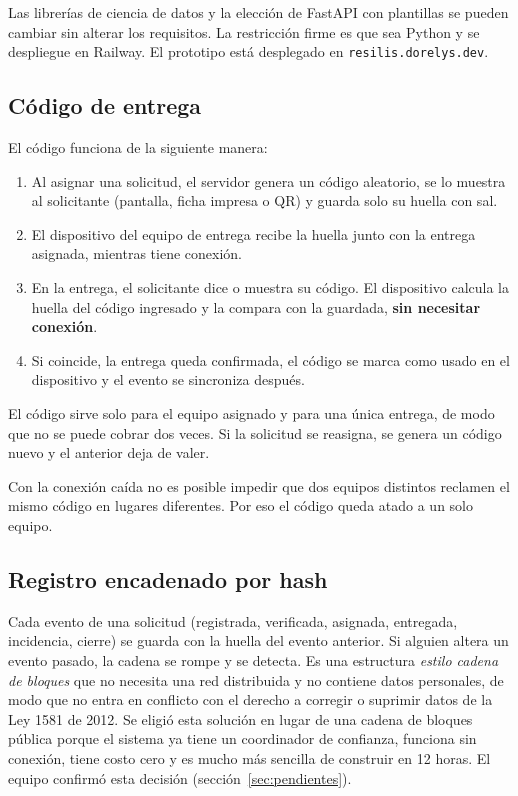 Las librerías de ciencia de datos y la elección de FastAPI con plantillas se pueden cambiar sin alterar los requisitos. La restricción firme es que sea Python y se despliegue en Railway. El prototipo está desplegado en \texttt{resilis.dorelys.dev}.

\subsection{Código de entrega}
El código funciona de la siguiente manera:
\begin{enumerate}
  \item Al asignar una solicitud, el servidor genera un código aleatorio, se lo muestra al solicitante (pantalla, ficha impresa o QR) y guarda solo su huella con sal.
  \item El dispositivo del equipo de entrega recibe la huella junto con la entrega asignada, mientras tiene conexión.
  \item En la entrega, el solicitante dice o muestra su código. El dispositivo calcula la huella del código ingresado y la compara con la guardada, \textbf{sin necesitar conexión}.
  \item Si coincide, la entrega queda confirmada, el código se marca como usado en el dispositivo y el evento se sincroniza después.
\end{enumerate}
El código sirve solo para el equipo asignado y para una única entrega, de modo que no se puede cobrar dos veces. Si la solicitud se reasigna, se genera un código nuevo y el anterior deja de valer.

Con la conexión caída no es posible impedir que dos equipos distintos reclamen el mismo código en lugares diferentes. Por eso el código queda atado a un solo equipo.

\subsection{Registro encadenado por hash}
Cada evento de una solicitud (registrada, verificada, asignada, entregada, incidencia, cierre) se guarda con la huella del evento anterior. Si alguien altera un evento pasado, la cadena se rompe y se detecta. Es una estructura \emph{estilo cadena de bloques} que no necesita una red distribuida y no contiene datos personales, de modo que no entra en conflicto con el derecho a corregir o suprimir datos de la Ley 1581 de 2012. Se eligió esta solución en lugar de una cadena de bloques pública porque el sistema ya tiene un coordinador de confianza, funciona sin conexión, tiene costo cero y es mucho más sencilla de construir en 12 horas. El equipo confirmó esta decisión (sección~\ref{sec:pendientes}).

